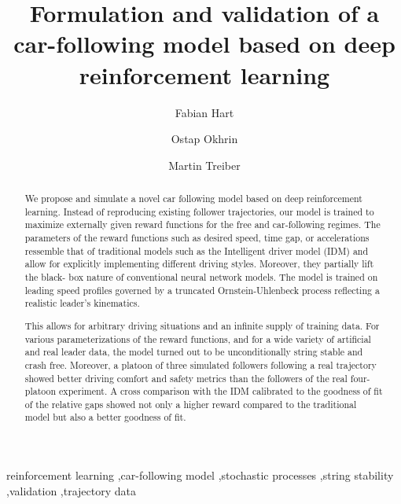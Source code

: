 \documentclass[review]{elsarticle}
\providecommand{\3}{{\ss}}
\begin{document}
	
	\begin{frontmatter}
		
		\title{Formulation and validation of a car-following model based on deep
			reinforcement learning}
		
		
		\author[firstAddress]{Fabian Hart}
		\author[firstAddress,secondAddress]{Ostap Okhrin}
		\author[firstAddress,secondAddress]{Martin Treiber}
		
		\address[firstAddress]{TU Dresden}
		\address[secondAddress]{Possible second address}
		
		
		
		
		\begin{abstract}		
		We propose and simulate a novel car following model based on deep reinforcement learning. Instead of reproducing  existing follower trajectories, our model is trained to maximize externally given reward functions for the free and car-following regimes. The parameters of the reward functions such as desired speed, time gap, or accelerations ressemble that of traditional models such as the Intelligent driver model (IDM) and allow for explicitly implementing different driving styles. Moreover, they partially lift the black- box nature of conventional neural network models. The model is trained on leading speed profiles governed by a truncated  Ornstein-Uhlenbeck process reflecting a realistic leader’s kinematics.
	
		This allows for arbitrary driving situations and an infinite supply of training data. For various parameterizations of the reward functions, and for a wide variety of artificial and real leader data, the model turned out to be unconditionally string stable and crash free. Moreover, a platoon of three simulated followers following a real trajectory showed better driving comfort and safety metrics than the followers of the real four-platoon experiment. A cross comparison with the IDM  calibrated to the goodness of fit of the relative gaps showed not only a higher reward compared to the traditional model but also a better goodness of fit.
		\end{abstract}
	
		
		\begin{keyword}
			reinforcement learning \sep car-following model \sep stochastic
			processes \sep string stability \sep validation \sep trajectory data 
		\end{keyword}
		
	\end{frontmatter}
	
\end{document}
